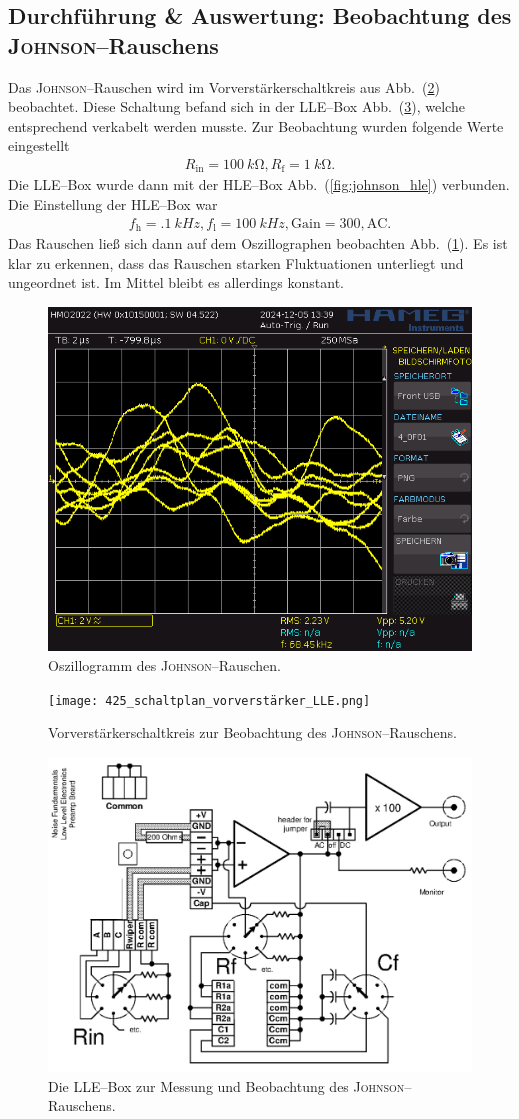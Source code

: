 \documentclass[sn-mathphys-num,iicol]{sn-jnl}
\theoremstyle{thmstyleone}
\theoremstyle{thmstyletwo}
\theoremstyle{thmstylethree}
\begin{document}
\subsection{Durchführung \& Auswertung: Beobachtung des \textsc{Johnson}--Rauschens}
Das \textsc{Johnson}--Rauschen wird im Vorverstärkerschaltkreis aus Abb.\ (\ref{fig:vorverstärker}) beobachtet.
Diese Schaltung befand sich in der LLE--Box Abb.\ (\ref{fig:johnson_lle}), welche entsprechend verkabelt werden musste.
Zur Beobachtung wurden folgende Werte eingestellt
\begin{align}
	R_\text{in}=\SI{100}{k\ohm},R_\text{f}=\SI{1}{k\ohm}
	.\end{align}
Die LLE--Box wurde dann mit der HLE--Box Abb.\ (\ref{fig:johnson_hle}) verbunden.
Die Einstellung der HLE--Box war
\begin{align}
	f_\text{h}=\SI{.1}{kHz},f_\text{l}=\SI{100}{kHz},\text{Gain}=300,\text{AC}
	.\end{align}
Das Rauschen ließ sich dann auf dem Oszillographen beobachten Abb.\ (\ref{fig:johnson_oszi}).
Es ist klar zu erkennen, dass das Rauschen starken Fluktuationen unterliegt und ungeordnet ist.
Im Mittel bleibt es allerdings konstant.

\begin{figure}[t]
	\centering
	\includegraphics[width=.5\textwidth]{../data/4_0F01.png}
	\caption{Oszillogramm des \textsc{Johnson}--Rauschen.} \label{fig:johnson_oszi}
\end{figure}

\begin{figure}[t]
	\centering
	\texttt{[image: 425\_schaltplan\_vorverstärker\_LLE.png]}
	\caption{Vorverstärkerschaltkreis zur Beobachtung des \textsc{Johnson}--Rauschens.\cite{anleitung425}} \label{fig:vorverstärker}
\end{figure}

\begin{figure}[t]
	\centering
	\includegraphics[width=.5\textwidth]{425_schaltplan_johnson_LLE.png}
	\caption{Die LLE--Box zur Messung und Beobachtung des \textsc{Johnson}--Rauschens.\cite{anleitung425}} \label{fig:johnson_lle}
\end{figure}
\end{document}
